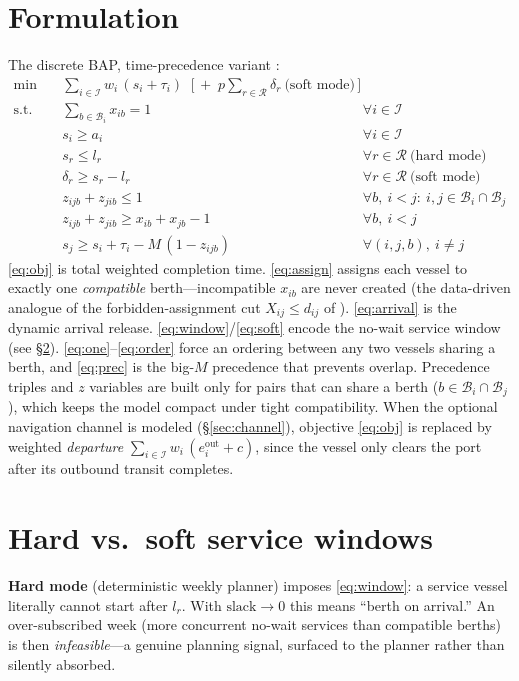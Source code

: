 \documentclass[11pt]{article}
\newcommand{\I}{\mathcal{I}}
\newcommand{\B}{\mathcal{B}}
\newcommand{\R}{\mathcal{R}}
\newcommand{\Bi}{\mathcal{B}_i}
\newcommand{\bigM}{M}
\begin{document}
\section{Formulation}
The discrete BAP, time-precedence variant
\citep{cordeau2005berth, alzaabi2016berth}:
\begin{align}
\min\quad & \sum_{i\in\I} w_i\,(s_i + \tau_i)
   \;\;\big[\,+\;p\!\!\sum_{r\in\R}\delta_r\ \text{(soft mode)}\,\big]
   \label{eq:obj}\\
\text{s.t.}\quad
& \sum_{b\in\Bi} x_{ib} = 1 && \forall i\in\I \label{eq:assign}\\
& s_i \ge a_i && \forall i\in\I \label{eq:arrival}\\
& s_r \le l_r && \forall r\in\R \ \text{(hard mode)} \label{eq:window}\\
& \delta_r \ge s_r - l_r && \forall r\in\R \ \text{(soft mode)} \label{eq:soft}\\
& z_{ijb} + z_{jib} \le 1 && \forall b,\ i<j:\ i,j\in\Bi\cap\B_j \label{eq:one}\\
& z_{ijb} + z_{jib} \ge x_{ib} + x_{jb} - 1 && \forall b,\ i<j \label{eq:order}\\
& s_j \ge s_i + \tau_i - \bigM\,(1 - z_{ijb}) && \forall (i,j,b),\ i\ne j \label{eq:prec}
\end{align}
\eqref{eq:obj} is total weighted completion time. \eqref{eq:assign} assigns each
vessel to exactly one \emph{compatible} berth---incompatible $x_{ib}$ are never
created (the data-driven analogue of the forbidden-assignment cut
$X_{ij}\le d_{ij}$ of \citealp{alzaabi2016berth}). \eqref{eq:arrival} is the
dynamic arrival release. \eqref{eq:window}/\eqref{eq:soft} encode the no-wait
service window (see \S\ref{sec:windows}). \eqref{eq:one}--\eqref{eq:order} force
an ordering between any two vessels sharing a berth, and \eqref{eq:prec} is the
big-$M$ precedence that prevents overlap. Precedence triples and $z$ variables
are built only for pairs that can share a berth ($b\in\Bi\cap\B_j$), which keeps
the model compact under tight compatibility. When the optional navigation
channel is modeled (\S\ref{sec:channel}), objective \eqref{eq:obj} is replaced by
weighted \emph{departure} $\sum_{i\in\I} w_i\,(e^{\mathrm{out}}_i + c)$, since the
vessel only clears the port after its outbound transit completes.

\section{Hard vs.\ soft service windows}\label{sec:windows}
\textbf{Hard mode} (deterministic weekly planner) imposes \eqref{eq:window}:
a service vessel literally cannot start after $l_r$. With $\text{slack}\to 0$
this means ``berth on arrival.'' An over-subscribed week (more concurrent
no-wait services than compatible berths) is then \emph{infeasible}---a genuine
planning signal, surfaced to the planner rather than silently absorbed.
\end{document}
